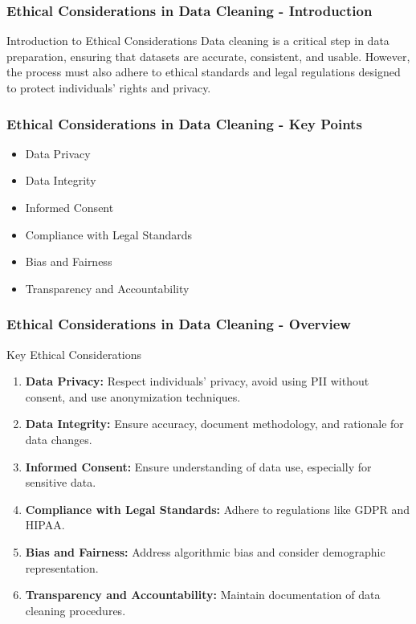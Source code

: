 \documentclass[aspectratio=169]{beamer}
\begin{document}
\begin{frame}[fragile]
    \frametitle{Ethical Considerations in Data Cleaning - Introduction}
    \begin{block}{Introduction to Ethical Considerations}
        Data cleaning is a critical step in data preparation, ensuring that datasets are accurate, consistent, and usable. However, the process must also adhere to ethical standards and legal regulations designed to protect individuals’ rights and privacy. 
    \end{block}
\end{frame}

\begin{frame}[fragile]
    \frametitle{Ethical Considerations in Data Cleaning - Key Points}
    \begin{itemize}
        \item Data Privacy
        \item Data Integrity
        \item Informed Consent
        \item Compliance with Legal Standards
        \item Bias and Fairness
        \item Transparency and Accountability
    \end{itemize}
\end{frame}

\begin{frame}[fragile]
    \frametitle{Ethical Considerations in Data Cleaning - Overview}
    \begin{block}{Key Ethical Considerations}
        \begin{enumerate}
            \item \textbf{Data Privacy:} Respect individuals’ privacy, avoid using PII without consent, and use anonymization techniques.
            \item \textbf{Data Integrity:} Ensure accuracy, document methodology, and rationale for data changes.
            \item \textbf{Informed Consent:} Ensure understanding of data use, especially for sensitive data.
            \item \textbf{Compliance with Legal Standards:} Adhere to regulations like GDPR and HIPAA.
            \item \textbf{Bias and Fairness:} Address algorithmic bias and consider demographic representation.
            \item \textbf{Transparency and Accountability:} Maintain documentation of data cleaning procedures.
        \end{enumerate}
    \end{block}
\end{frame}
\end{document}

